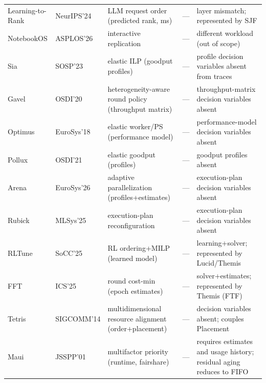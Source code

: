 \documentclass{ieeetj}
\begin{document}
\begin{table}[htb!]
\begin{tabularx}{\textwidth}{@{}llYcY@{}}
Learning-to-Rank\cite{fu2024efficient} & NeurIPS'24 & LLM request order (predicted rank, ms) & --- & layer mismatch; represented by SJF\\
NotebookOS\cite{notebookos2026} & ASPLOS'26 & interactive replication & --- & different workload (out of scope)\\
Sia\cite{b4} & SOSP'23 & elastic ILP (goodput profiles) & --- & profile decision variables absent from traces\\
Gavel\cite{narayanan2020gavel} & OSDI'20 & heterogeneity-aware round policy (throughput matrix) & --- & throughput-matrix decision variables absent\\
Optimus\cite{peng2018optimus} & EuroSys'18 & elastic worker/PS (performance model) & --- & performance-model decision variables absent\\
Pollux\cite{qiao2021pollux} & OSDI'21 & elastic goodput (profiles) & --- & goodput profiles absent\\
Arena\cite{arena2026} & EuroSys'26 & adaptive parallelization (profiles+estimates) & --- & execution-plan decision variables absent\\
Rubick\cite{rubick2025} & MLSys'25 & execution-plan reconfiguration & --- & execution-plan decision variables absent\\
RLTune\cite{rltune2025} & SoCC'25 & RL ordering+MILP (learned model) & --- & learning+solver; represented by Lucid/Themis\\
FFT\cite{fft2025} & ICS'25 & round cost-min (epoch estimates) & --- & solver+estimates; represented by Themis (FTF)\\
Tetris\cite{grandl2014multi} & SIGCOMM'14 & multidimensional resource alignment (order$+$placement) & --- & decision variables absent; couples Placement\\
Maui\cite{jackson2001maui} & JSSPP'01 & multifactor priority (runtime, fairshare) & --- & requires estimates and usage history; residual aging reduces to FIFO\\
\bottomrule
\end{tabularx}
\end{table}
\end{document}
